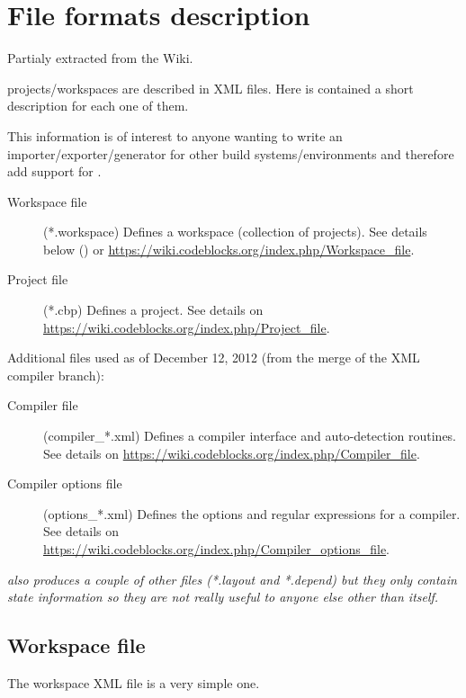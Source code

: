 \section{File formats description}\label{sec:file_formats}

Partialy extracted from the Wiki.

\codeblocks projects/workspaces are described in XML files. Here is contained a short description for each one of them.

This information is of interest to anyone wanting to write an importer/exporter/generator for other build systems/environments and therefore add support for \codeblocks.

\begin{description}
\item[Workspace file] (*.workspace) Defines a \codeblocks workspace (collection of projects). See details below () or \url{https://wiki.codeblocks.org/index.php/Workspace_file}.
\item[Project file] (*.cbp) Defines a \codeblocks project. See details on \url{https://wiki.codeblocks.org/index.php/Project_file}.
\end{description}

Additional files used as of December 12, 2012 (from the merge of the XML compiler branch):

\begin{description}
\item[Compiler file] (compiler\_*.xml) Defines a \codeblocks compiler interface and auto-detection routines. See details on \url{https://wiki.codeblocks.org/index.php/Compiler_file}.
\item[Compiler options file] (options\_*.xml) Defines the options and regular expressions for a \codeblocks compiler. See details on \url{https://wiki.codeblocks.org/index.php/Compiler_options_file}.
\end{description}

\textit{\codeblocks also produces a couple of other files (*.layout and *.depend) but they only contain state information so they are not really useful to anyone else other than \codeblocks itself.}

\subsection*{Workspace file}\label{sec:workspace_file}

The workspace XML file is a very simple one.

